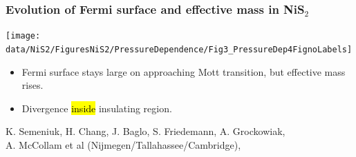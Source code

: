 \begin{frame}[label=QONiS2]
\frametitle{Evolution of Fermi surface and effective mass in NiS$_2$}
\vspace{0.5em}

\centerline{\texttt{[image: \\data/NiS2/FiguresNiS2/PressureDependence/Fig3\_PressureDep4FignoLabels]}}
\begin{itemize}
\item
Fermi surface stays large on approaching Mott transition, but
effective mass rises.
\item
Divergence \hl{inside} insulating region.
\end{itemize}

\vspace*{\fill}
\centerline{\makebox[\linewidth]{\rule{0.85\textwidth}{0.4pt}}}
\begin{center}
{\scriptsize K. Semeniuk, H. Chang, J. Baglo, S. Friedemann, A. Grockowiak, \\
A. McCollam et al (Nijmegen/Tallahassee/Cambridge),  }
\end{center}

\end{frame}


